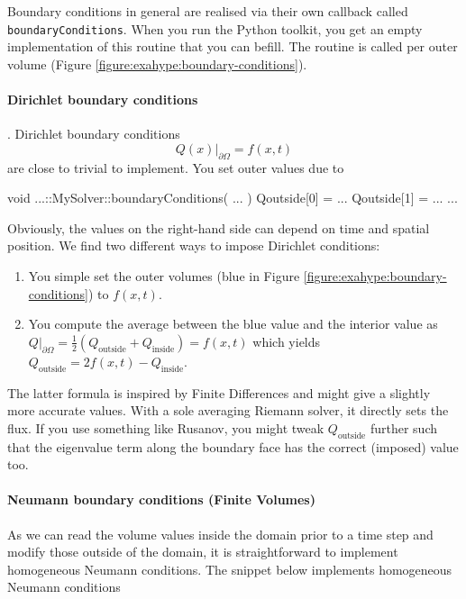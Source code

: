 \noindent
Boundary conditions in general are realised via their own callback called
\texttt{boundaryConditions}.
When you run the Python toolkit, you get an empty implementation of this routine
that you can befill.
The routine is called per outer volume (Figure
\ref{figure:exahype:boundary-conditions}).



\paragraph{Dirichlet boundary conditions}.
%
%
%
Dirichlet boundary conditions 
\[
  Q(x) | _{\partial \Omega } = f(x,t)
\]
are close to trivial to implement. 
You set  outer values due to

\begin{code}
void ...::MySolver::boundaryConditions(
  ...
) {
  Qoutside[0] = ...
  Qoutside[1] = ...
  ...
}
\end{code}

\noindent
Obviously, the values on the right-hand side can depend on time and spatial
position.
We find two different ways to impose Dirichlet conditions:
\begin{enumerate}
  \item You simple set the outer volumes (blue in Figure
\ref{figure:exahype:boundary-conditions}) to $f(x,t)$.
  \item You compute the average between the blue value and the interior value as
  $Q | _{\partial \Omega } = \frac{1}{2} (Q_{\text{outside}} +
  Q_{\text{inside}}) = f(x,t)$ which yields $Q_{\text{outside}} =
  2f(x,t)-Q_{\text{inside}}$.
\end{enumerate}

\noindent
The latter formula is inspired by Finite Differences and might give a slightly
more accurate values.
With a sole averaging Riemann solver, it directly sets the flux.
If you use something like Rusanov, you might tweak $Q_{\text{outside}}$ further
such that the eigenvalue term along the boundary face has the correct
(imposed) value too.


\paragraph{Neumann boundary conditions (Finite Volumes)}

As we can read the volume values inside the domain prior to a time step
and modify those outside of the domain, it is straightforward to implement
homogeneous Neumann conditions.
The snippet below implements homogeneous Neumann conditions

